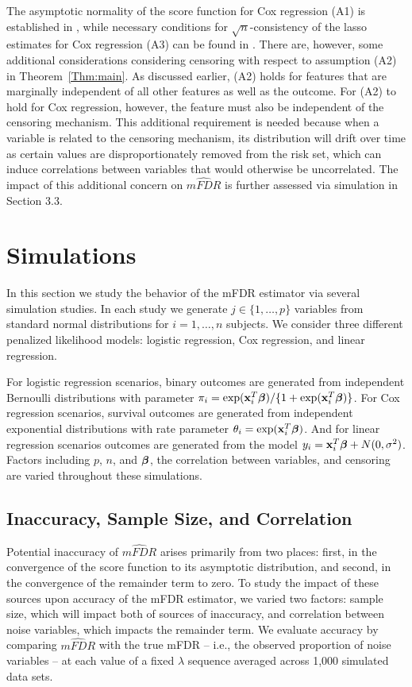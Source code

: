 The asymptotic normality of the score function for Cox regression (A1) is established in \citet{Andersen1982}, while necessary conditions for $\sqrt{n}$-consistency of the lasso estimates for Cox regression (A3) can be found in \citet{Fan_scad}.  There are, however, some additional considerations considering censoring with respect to assumption (A2) in Theorem~\ref{Thm:main}.  As discussed earlier, (A2) holds for features that are marginally independent of all other features as well as the outcome.  For (A2) to hold for Cox regression, however, the feature must also be independent of the censoring mechanism.  This additional requirement is needed because when a variable is related to the censoring mechanism, its distribution will drift over time as certain values are disproportionately removed from the risk set, which can induce correlations between variables that would otherwise be uncorrelated. The impact of this additional concern on $\widehat{mFDR}$ is further assessed via simulation in Section 3.3. 

\section{Simulations}

In this section we study the behavior of the mFDR estimator via several simulation studies. In each study we generate $j \in \{1, \ldots, p\}$ variables from standard normal distributions for $i = 1, \ldots, n$ subjects. We consider three different penalized likelihood models: logistic regression, Cox regression, and linear regression.

For logistic regression scenarios, binary outcomes are generated from independent Bernoulli distributions with parameter $\pi_i = \exp(\mathbf{x}_i^T \boldsymbol{\beta})/\{1 + \exp(\mathbf{x}_i^T \boldsymbol{\beta})\}$. For Cox regression scenarios, survival outcomes are generated from independent exponential distributions with rate parameter $\theta_i = \exp(\mathbf{x}_i^T \boldsymbol{\beta})$. And for linear regression scenarios outcomes are generated from the model $y_i = \mathbf{x}_i^T\boldsymbol{\beta} + N(0,\sigma^2)$. Factors including $p$, $n$, and $\boldsymbol{\beta}$, the correlation between variables, and censoring are varied throughout these simulations.

\subsection{Inaccuracy, Sample Size, and Correlation}

Potential inaccuracy of $\widehat{mFDR}$ arises primarily from two places: first, in the convergence of the score function to its asymptotic distribution, and second, in the convergence of the remainder term to zero. To study the impact of these sources upon accuracy of the mFDR estimator, we varied two factors: sample size, which will impact both of sources of inaccuracy, and correlation between noise variables, which impacts the remainder term. We evaluate accuracy by comparing $\widehat{mFDR}$ with the true mFDR -- i.e., the observed proportion of noise variables -- at each value of a fixed $\lambda$ sequence averaged across 1,000 simulated data sets.

